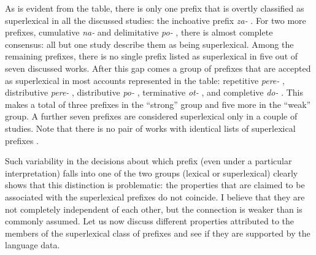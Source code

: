 As is evident from the table, there is only one prefix that is overtly classified as superlexical in all the discussed studies: the inchoative  prefix \textit{za-}  . For two more prefixes, cumulative  \textit{na-}   and delimitative  \textit{po-} , there is almost complete consensus: all but one study describe them as being superlexical. Among the remaining prefixes, there is no single prefix listed as superlexical in five out of seven discussed works. After this gap comes a group of prefixes that are accepted as superlexical in most accounts represented in the table: repetitive  \textit{pere-} , distributive  \textit{pere-} , distributive  \textit{po-} , terminative  \textit{ot-} , and completive  \textit{do-}  . This makes a total of three prefixes in the ``strong'' group and five more in the ``weak'' group. A further seven prefixes are considered superlexical only in a couple of studies. Note that there is no pair of works with identical lists of superlexical prefixes . 

Such variability in the decisions about which prefix (even under a particular interpretation) falls into one of the two groups (lexical or superlexical) clearly shows that this distinction is problematic: the properties that are claimed to be associated with the superlexical prefixes  do not coincide. I believe that they are not completely independent of each other, but the connection is weaker than is commonly assumed. Let us now discuss different properties attributed to the members of the superlexical class of prefixes and see if they are supported by the language data.



